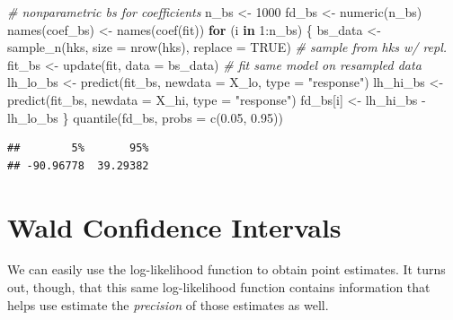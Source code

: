 \documentclass[
]{book}
\newenvironment{Shaded}{\begin{snugshade}}{\end{snugshade}}
\newcommand{\AttributeTok}[1]{\textcolor[rgb]{0.77,0.63,0.00}{#1}}
\newcommand{\CommentTok}[1]{\textcolor[rgb]{0.56,0.35,0.01}{\textit{#1}}}
\newcommand{\ConstantTok}[1]{\textcolor[rgb]{0.00,0.00,0.00}{#1}}
\newcommand{\ControlFlowTok}[1]{\textcolor[rgb]{0.13,0.29,0.53}{\textbf{#1}}}
\newcommand{\DecValTok}[1]{\textcolor[rgb]{0.00,0.00,0.81}{#1}}
\newcommand{\FloatTok}[1]{\textcolor[rgb]{0.00,0.00,0.81}{#1}}
\newcommand{\FunctionTok}[1]{\textcolor[rgb]{0.00,0.00,0.00}{#1}}
\newcommand{\NormalTok}[1]{#1}
\newcommand{\OtherTok}[1]{\textcolor[rgb]{0.56,0.35,0.01}{#1}}
\newcommand{\SpecialCharTok}[1]{\textcolor[rgb]{0.00,0.00,0.00}{#1}}
\newcommand{\StringTok}[1]{\textcolor[rgb]{0.31,0.60,0.02}{#1}}
\begin{document}
\begin{Shaded}
\begin{Highlighting}[]
\CommentTok{\# nonparametric bs for coefficients}
\NormalTok{n\_bs }\OtherTok{\textless{}{-}} \DecValTok{1000}
\NormalTok{fd\_bs }\OtherTok{\textless{}{-}} \FunctionTok{numeric}\NormalTok{(n\_bs)}
\FunctionTok{names}\NormalTok{(coef\_bs) }\OtherTok{\textless{}{-}} \FunctionTok{names}\NormalTok{(}\FunctionTok{coef}\NormalTok{(fit))}
\ControlFlowTok{for}\NormalTok{ (i }\ControlFlowTok{in} \DecValTok{1}\SpecialCharTok{:}\NormalTok{n\_bs) \{}
\NormalTok{  bs\_data }\OtherTok{\textless{}{-}} \FunctionTok{sample\_n}\NormalTok{(hks, }\AttributeTok{size =} \FunctionTok{nrow}\NormalTok{(hks), }\AttributeTok{replace =} \ConstantTok{TRUE}\NormalTok{)  }\CommentTok{\# sample from hks w/ repl.}
\NormalTok{  fit\_bs }\OtherTok{\textless{}{-}} \FunctionTok{update}\NormalTok{(fit, }\AttributeTok{data =}\NormalTok{ bs\_data)                       }\CommentTok{\# fit same model on resampled data}
\NormalTok{  lh\_lo\_bs }\OtherTok{\textless{}{-}} \FunctionTok{predict}\NormalTok{(fit\_bs, }\AttributeTok{newdata =}\NormalTok{ X\_lo, }\AttributeTok{type =} \StringTok{"response"}\NormalTok{)}
\NormalTok{  lh\_hi\_bs }\OtherTok{\textless{}{-}} \FunctionTok{predict}\NormalTok{(fit\_bs, }\AttributeTok{newdata =}\NormalTok{ X\_hi, }\AttributeTok{type =} \StringTok{"response"}\NormalTok{)}
\NormalTok{  fd\_bs[i] }\OtherTok{\textless{}{-}}\NormalTok{ lh\_hi\_bs }\SpecialCharTok{{-}}\NormalTok{ lh\_lo\_bs}
\NormalTok{\}}
\FunctionTok{quantile}\NormalTok{(fd\_bs, }\AttributeTok{probs =} \FunctionTok{c}\NormalTok{(}\FloatTok{0.05}\NormalTok{, }\FloatTok{0.95}\NormalTok{))}
\end{Highlighting}
\end{Shaded}

\begin{verbatim}
##        5%       95% 
## -90.96778  39.29382
\end{verbatim}

\hypertarget{wald-confidence-intervals}{%
\section{Wald Confidence Intervals}\label{wald-confidence-intervals}}

We can easily use the log-likelihood function to obtain point estimates. It turns out, though, that this same log-likelihood function contains information that helps use estimate the \emph{precision} of those estimates as well.
\end{document}

